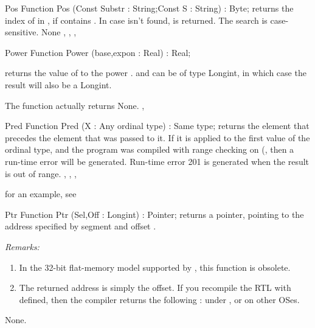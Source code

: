 \documentclass{report}
\begin{document}

\begin{function}{Pos}
\Declaration
Function Pos (Const Substr : String;Const S : String) : Byte;
\Description
{} returns the index of  in , if  contains
. In case  isn't found,  is returned.
The search is case-sensitive.
\Errors
None
\SeeAlso
{}, , , 
\end{function}


\begin{function}{Power}
\Declaration
Function Power (base,expon : Real) : Real;
\Description

 returns the value of  to the power .
 and  can be of type Longint, in which case the
result will also be a Longint.

The function actually returns 
\Errors
None.
\SeeAlso
{}, 
\end{function}


\begin{function}{Pred}
\Declaration
Function Pred (X : Any ordinal type) : Same type;
\Description
  returns the element that precedes the element that was passed
to it. If it is applied to the first value of the ordinal type, and the
program was compiled with range checking on (, then a run-time
error will be generated.
\Errors
Run-time error 201 is generated when the result is out of
range.
\SeeAlso
{}, , , 
\end{function}

for an example, see 

\begin{function}{Ptr}
\Declaration
Function Ptr (Sel,Off : Longint) : Pointer;
\Description
{} returns a pointer, pointing to the address specified by
segment  and offset .

{\em Remarks:} 
\begin{enumerate}
\item In the 32-bit flat-memory model supported by \fpc, this
function is obsolete.
\item The returned address is simply the offset. If you recompile
the RTL with  defined, then the compiler returns the
following :  under \dos, or
 on other OSes.
\end{enumerate}
\Errors
None.
\SeeAlso
{}
\end{function}
\end{document}
